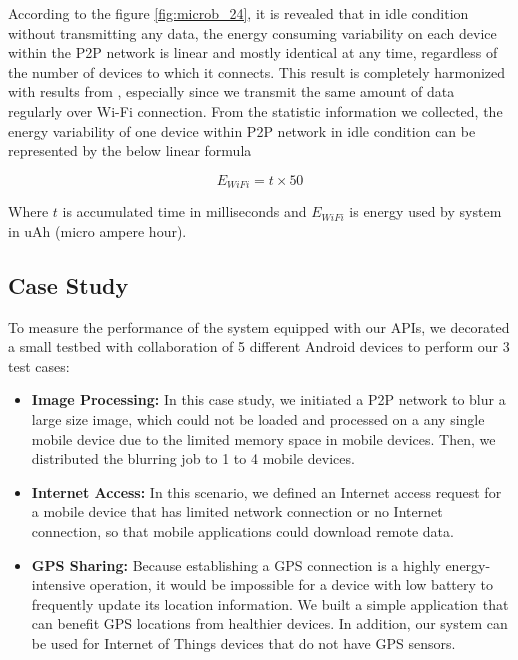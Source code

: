 \documentclass{sig-alternate}[10pt]
\begin{document}
According to the figure \ref{fig:microb_24}, it is revealed that in idle condition without transmitting any data, the energy consuming variability on each device within the P2P network is linear and mostly identical at any time, regardless of the number of devices to which it connects. This result is completely harmonized with results from \cite{wifi_energy}, especially since we transmit the same amount of data regularly over Wi-Fi connection. From the statistic information we collected, the energy variability of one device within P2P network in idle condition can be represented by the below linear formula

\begin{equation}
\label{eq:wifi_overload}
E_{WiFi} = t \times 50
\end{equation}

Where $t$ is accumulated time in milliseconds and $E_{WiFi}$ is energy used by system in uAh (micro ampere hour).

\subsection{Case Study}
To measure the performance of the system equipped with our APIs, we decorated a small testbed with collaboration of 5 different Android devices to perform our 3 test cases:
\begin{itemize}
	\item \textbf{Image Processing:} In this case study, we initiated a P2P network to blur a large size image, which could not be loaded and processed on a any single mobile device due to the limited memory space in mobile devices. Then, we distributed the blurring job to 1 to 4 mobile devices. 
	\item \textbf{Internet Access:} In this scenario, we defined an Internet access request for a mobile device that has limited network connection or no Internet connection, so that mobile applications could download remote data.
	\item \textbf{GPS Sharing:} Because establishing a GPS connection is a highly energy-intensive operation, it would be impossible for a device with low battery to frequently update its location information. We built a simple application that can benefit GPS locations from healthier devices. In addition, our system can be used for Internet of Things devices that do not have GPS sensors.
\end{itemize}
\end{document}
